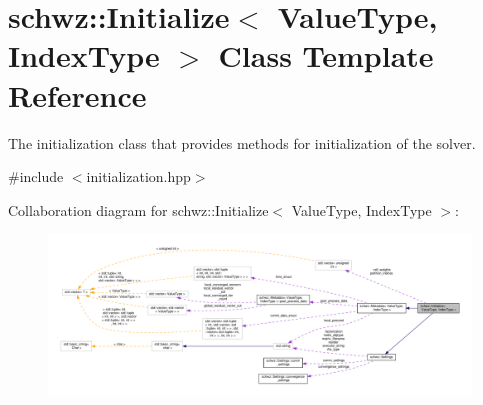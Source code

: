 \hypertarget{classschwz_1_1Initialize}{}\section{schwz\+:\+:Initialize$<$ Value\+Type, Index\+Type $>$ Class Template Reference}
\label{classschwz_1_1Initialize}


The initialization class that provides methods for initialization of the solver.  




{\ttfamily \#include $<$initialization.\+hpp$>$}



Collaboration diagram for schwz\+:\+:Initialize$<$ Value\+Type, Index\+Type $>$\+:
\nopagebreak
\begin{figure}[H]
\begin{center}
\leavevmode
\includegraphics[width=350pt]{classschwz_1_1Initialize__coll__graph}
\end{center}
\end{figure}
